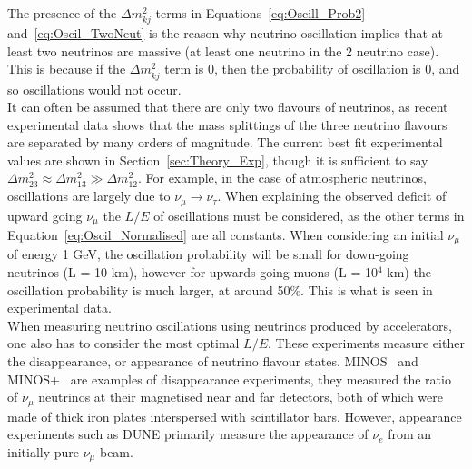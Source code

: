 The presence of the $\Delta m^{2}_{kj}$ terms in Equations~\ref{eq:Oscill_Prob2} and~\ref{eq:Oscil_TwoNeut} is the reason why neutrino oscillation implies that at least two neutrinos are massive (at least one neutrino in the 2 neutrino case). This is because if the $\Delta m^{2}_{kj}$ term is 0, then the probability of oscillation is 0, and so oscillations would not occur. \\

It can often be assumed that there are only two flavours of neutrinos, as recent experimental data shows that the mass splittings of the three neutrino flavours are separated by many orders of magnitude. The current best fit experimental values are shown in Section~\ref{sec:Theory_Exp}, though it is sufficient to say $\Delta m^{2}_{23} \approx \Delta m^{2}_{13} \gg \Delta m^{2}_{12}$. For example, in the case of atmospheric neutrinos, oscillations are largely due to $\nu_{\mu}\rightarrow\nu_{\tau}$. When explaining the observed deficit of upward going $\nu_{\mu}$ the $L/E$ of oscillations must be considered, as the other terms in Equation~\ref{eq:Oscil_Normalised} are all constants. When considering an initial $\nu_{\mu}$ of energy 1 GeV, the oscillation probability will be small for down-going neutrinos (L = 10 km), however for upwards-going muons (L = 10$^4$ km) the oscillation probability is much larger, at around 50\%. This is what is seen in experimental data. \\

When measuring neutrino oscillations using neutrinos produced by accelerators, one also has to consider the most optimal $L/E$. These experiments measure either the disappearance, or appearance of neutrino flavour states. MINOS~\citep{2008NIMPA.596..190M} and MINOS+~\citep{Tzanankos:2011zz} are examples of disappearance experiments, they measured the ratio of $\nu_{\mu}$ neutrinos at their magnetised near and far detectors, both of which were made of thick iron plates interspersed with scintillator bars. However, appearance experiments such as DUNE primarily measure the appearance of $\nu_{e}$ from an initially pure $\nu_{\mu}$ beam. \\

